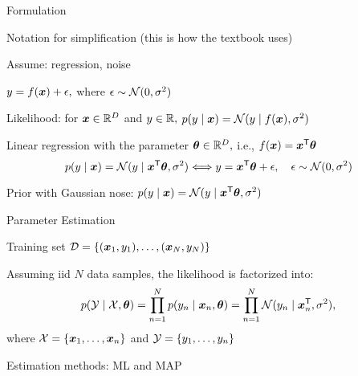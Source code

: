 \documentclass[handout,fleqn,aspectratio=169]{beamer}
\begin{document}
\begin{frame}{Formulation}

\plitemsep 0.07in

\bci 


\item[] 
{\small
Notation for simplification (this is how the textbook uses)
}
\item Assume:  regression,  noise

\item $y = f(\bm{x}) + \epsilon,$ where $\epsilon \sim \mathcal N(0,\sigma^2)$


\item Likelihood: for $\bm{x} \in {\mathbb R}^D$ and $y \in {\mathbb R},$ $p(y \mid \bm{x}) = \mathcal N(y \mid f(\bm{x}), \sigma^2)$ 


\item Linear regression with the parameter $\bm{\theta} \in {\mathbb R}^{D},$ i.e., $f(\bm{x}) = {\bm{x}}^{\mathsf{T}}\bm{\theta}$
$$
p(y \mid \bm{x}) = \mathcal N(y \mid {\bm{x}}^{\mathsf{T}}\bm{\theta}, \sigma^2) \Longleftrightarrow y = {\bm{x}}^{\mathsf{T}}\bm{\theta} + \epsilon, \quad \epsilon \sim \mathcal N(0,\sigma^2)
$$

\mycolorbox
{
\centering
Prior with Gaussian nose: $p(y \mid \bm{x}) = \mathcal N(y \mid {\bm{x}}^{\mathsf{T}}\bm{\theta}, \sigma^2)$
}

\eci
\end{frame}

\begin{frame}{Parameter Estimation}

\plitemsep 0.2in

\bci 

\item Training set $\mathcal D = \{(\bm{x}_1, y_1), \ldots, (\bm{x}_N,y_N) \}$\hspace{3cm} 

\item Assuming iid $N$ data samples, the likelihood is factorized into:
$$
p(\mathcal Y \mid \mathcal X,\bm{\theta}) = \prod_{n=1}^N p(y_n \mid \bm{x}_n, \bm{\theta}) = \prod_{n=1}^N 
\mathcal N(y_n \mid {\bm{x}}^{\mathsf{T}}_n, \sigma^2),
$$
where $\mathcal X = \{\bm{x}_1,\ldots,\bm{x}_n \}$ and $\mathcal Y = \{y_1,\ldots,y_n \}$
\item Estimation methods: ML and MAP
\eci
\end{frame}
\end{document}

